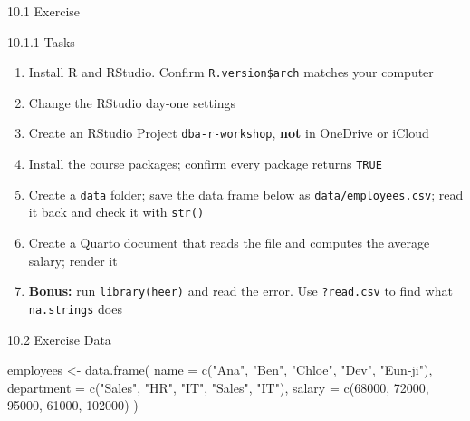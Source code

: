 \documentclass[
  ignorenonframetext,
  aspectratio=169,
]{beamer}
\newenvironment{Shaded}{\begin{snugshade}}{\end{snugshade}}
\newcommand{\AttributeTok}[1]{\textcolor[rgb]{0.40,0.45,0.13}{#1}}
\newcommand{\DecValTok}[1]{\textcolor[rgb]{0.68,0.00,0.00}{#1}}
\newcommand{\FunctionTok}[1]{\textcolor[rgb]{0.28,0.35,0.67}{#1}}
\newcommand{\NormalTok}[1]{\textcolor[rgb]{0.00,0.23,0.31}{#1}}
\newcommand{\OtherTok}[1]{\textcolor[rgb]{0.00,0.23,0.31}{#1}}
\newcommand{\StringTok}[1]{\textcolor[rgb]{0.13,0.47,0.30}{#1}}
\providecommand{\tightlist}{%
  \setlength{\itemsep}{0pt}\setlength{\parskip}{0pt}}
\begin{document}
\begin{frame}[fragile]{10.1 Exercise}
\protect{}\label{exercise}
\begin{alertblock}{10.1.1 Tasks}
\protect{}\label{tasks}
\begin{enumerate}
\tightlist
\item
  Install R and RStudio. Confirm \texttt{R.version\$arch} matches your
  computer
\item
  Change the RStudio day-one settings
\item
  Create an RStudio Project \texttt{dba-r-workshop}, \textbf{not} in
  OneDrive or iCloud
\item
  Install the course packages; confirm every package returns
  \texttt{TRUE}
\item
  Create a \texttt{data} folder; save the data frame below as
  \texttt{data/employees.csv}; read it back and check it with
  \texttt{str()}
\item
  Create a Quarto document that reads the file and computes the average
  salary; render it
\item
  \textbf{Bonus:} run \texttt{library(heer)} and read the error. Use
  \texttt{?read.csv} to find what \texttt{na.strings} does
\end{enumerate}
\end{alertblock}
\end{frame}

\begin{frame}[fragile]{10.2 Exercise Data}
\protect{}\label{exercise-data}
\begin{Shaded}
\begin{Highlighting}[]
\NormalTok{employees }\OtherTok{\textless{}{-}} \FunctionTok{data.frame}\NormalTok{(}
  \AttributeTok{name       =} \FunctionTok{c}\NormalTok{(}\StringTok{"Ana"}\NormalTok{, }\StringTok{"Ben"}\NormalTok{, }\StringTok{"Chloe"}\NormalTok{, }\StringTok{"Dev"}\NormalTok{, }\StringTok{"Eun{-}ji"}\NormalTok{),}
  \AttributeTok{department =} \FunctionTok{c}\NormalTok{(}\StringTok{"Sales"}\NormalTok{, }\StringTok{"HR"}\NormalTok{, }\StringTok{"IT"}\NormalTok{, }\StringTok{"Sales"}\NormalTok{, }\StringTok{"IT"}\NormalTok{),}
  \AttributeTok{salary     =} \FunctionTok{c}\NormalTok{(}\DecValTok{68000}\NormalTok{, }\DecValTok{72000}\NormalTok{, }\DecValTok{95000}\NormalTok{, }\DecValTok{61000}\NormalTok{, }\DecValTok{102000}\NormalTok{)}
\NormalTok{)}
\end{Highlighting}
\end{Shaded}
\end{frame}
\end{document}
